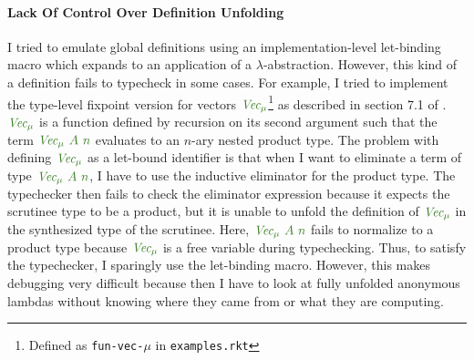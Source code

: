 \documentclass{article}
\theoremstyle{definition}
\newcommand{\Gcmath}[1]{{\color{OliveGreen}#1}}
\begin{document}
\paragraph{Lack Of Control Over Definition Unfolding}
I tried to emulate global definitions using an implementation-level let-binding
macro which expands to an application of a \(\lambda\)-abstraction. However,
this kind of a definition fails to typecheck in some cases. For example, I tried
to implement the type-level fixpoint version for vectors
\(\Gcmath{\textit{Vec}_\mu}\)\footnote{Defined as \texttt{fun-vec-}\(\mu\) in
\texttt{examples.rkt}} as described in section 7.1 of
\citet{lennon-bertrand_gradualizing_2022}. \(\Gcmath{\textit{Vec}_\mu}\) is a
function defined by recursion on its second argument such that the term
\(\Gcmath{\textit{Vec}_\mu\ A\ n}\) evaluates to an \(n\)-ary nested product
type. The problem with defining \(\Gcmath{\textit{Vec}_\mu}\) as a let-bound
identifier is that when I want to eliminate a term of type
\(\Gcmath{\textit{Vec}_\mu\ A\ n}\), I have to use the inductive eliminator for
the product type. The typechecker then fails to check the eliminator expression
because it expects the scrutinee type to be a product, but it is unable to
unfold the definition of \(\Gcmath{\textit{Vec}_\mu}\) in the synthesized type
of the scrutinee. Here, \(\Gcmath{\textit{Vec}_\mu\ A\ n}\) fails to normalize
to a product type because \(\Gcmath{\textit{Vec}_\mu}\) is a free variable
during typechecking. Thus, to satisfy the typechecker, I sparingly use the
let-binding macro. However, this makes debugging very difficult because then I
have to look at fully unfolded anonymous lambdas without knowing where they came
from or what they are computing.
\end{document}
